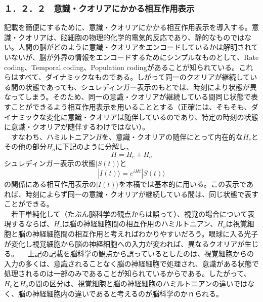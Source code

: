 \subsubsection{１．２．２　意識・クオリアにかかる相互作用表示}
記載を簡便にするために、意識・クオリアにかかる相互作用表示を導入する。意識・クオリアは、脳細胞の物理的化学的電気的反応であり、静的なものではない。人間の脳がどのように意識・クオリアをエンコードしているかは解明されていないが、脳が外界の情報をエンコードするためにシンプルなものとして、Rate coding、Temporal coding、Population codingがあることが知られている\cite{wikipediac}。これらはすべて、ダイナミックなものである。しがって同一のクオリアが継続している間の状態であっても、シュレディンガー表示のもとでは、時刻により状態が異なってしまう。そのため、同一の意識・クオリアが継続している間同じ状態で表すことができるよう相互作用表示を用いることとする（正確には、そもそも、ダイナミックな変化に意識・クオリアは随伴しているのであり、特定の時刻の状態に意識・クオリアが随伴するわけではない）。\\
　すなわち、ハミルトニアン$H$を、意識・クオリアの随伴にとって内在的な$H_c$とその他の部分$H_o$に下記のように分解し、
　\begin{equation}
  H=H_c + H_o
\end{equation}
シュレディンガー表示の状態$|S(t)\rangle$と
　\begin{equation}
  |I(t)\rangle = e^{iHt}|S(t)\rangle
\end{equation}
の関係にある相互作用表示の$|I(t)\rangle$を本稿では基本的に用いる。この表示であれば、時刻によらず同一の意識・クオリアが継続している間は、同じ状態で表すことができる。\\
　若干単純化して（たぶん脳科学の観点からは誤って）、視覚の場合について表現するならば、$H_c$は脳の神経細胞間の相互作用のハミルトニアン、$H_o$は視覚細胞と脳の神経細胞間の相互作用と考えればわかりやすいだろう。眼球に入る光子が変化し視覚細胞から脳の神経細胞への入力が変われば、異なるクオリアが生じる。
　上記の記載を脳科学の観点から誤っているとしたのは、視覚細胞からの入力の多くは、意識されることなく脳の神経細胞で処理され、意識がある状態で処理されるのは一部のみであることが知られているからである。したがって、$H_c$と$H_o$の間の区分は、視覚細胞と脳の神経細胞のハミルトニアンの違いではなく、脳の神経細胞内の違いであると考えるのが脳科学のかｎられる。